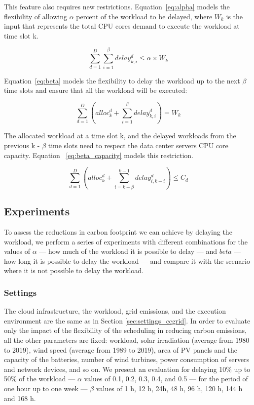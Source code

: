 This feature also requires new restrictions. Equation~\eqref{eq:alpha} models the flexibility of allowing $\alpha$ percent of the workload to be delayed, where $W_k$ is the input that represents the total CPU cores demand to execute the workload at time slot k.


\begin{equation} \label{eq:alpha}
   \sum_{d=1}^D  \sum_{i=1}^{\beta} delay_{k,i}^d \leq  \alpha   \times W_k
\end{equation}


Equation~\eqref{eq:beta} models the flexibility to delay the workload up to the next $\beta$ time slots and ensure that all the workload will be executed:


\begin{equation} \label{eq:beta}
       \sum_{d=1}^D    (alloc_k^d +    \sum_{i=1}^{\beta} delay_{k,i}^d) = W_k  
     \end{equation}

The allocated workload at a time slot k, and the delayed workloads from the previous k - $\beta$ time slots need to respect the data center servers CPU core capacity. Equation ~\eqref{eq:beta_capacity} models this restriction. 

\begin{equation} \label{eq:beta_capacity}
\sum_{d=1}^D    (alloc_k^d  +    \sum_{i=k-\beta}^{k-1} delay_{  i ,  k-i  }^d)  \leq C_d 
\end{equation}

\subsection{Experiments}

To assess the reductions in carbon footprint we can achieve by delaying the workload, we perform a series of experiments with different combinations for the values of $\alpha$ --- how much of the workload it is possible to delay --- and $beta$ --- how long it is possible to delay the workload --- and compare it with the scenario where it is not possible to delay the workload. 

\subsubsection{Settings}

The cloud infrastructure, the workload, grid emissions, and the execution environment are the same as in Section  \ref{sec:settings_ccgrid}. In order to evaluate only the impact of the flexibility of the scheduling in reducing carbon emissions, all the other parameters are fixed: workload, solar irradiation (average from 1980 to 2019), wind speed (average from 1989 to 2019), area of PV panels and the capacity of the batteries, number of wind turbines, power consumption of servers and network devices, and so on. We present an evaluation for delaying 10\% up to 50\% of the workload --- $\alpha$ values of 0.1, 0.2, 0.3, 0.4, and 0.5 --- for the period of one hour up to one week --- $\beta$ values of 1 h, 12 h, 24h, 48 h, 96 h, 120 h, 144 h and 168 h.

